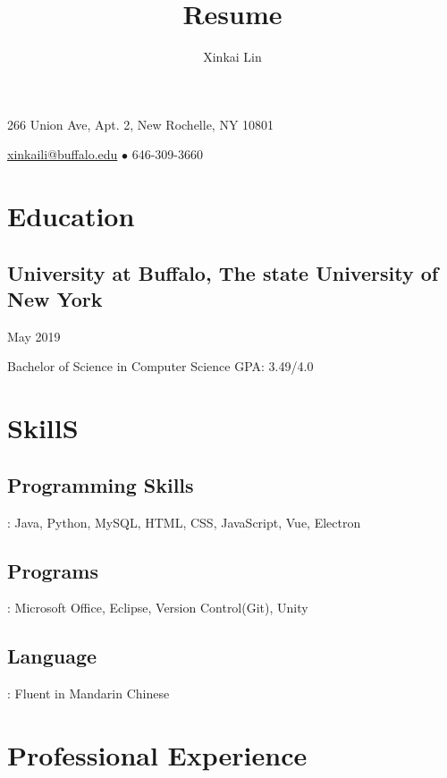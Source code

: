 \documentclass[11pt, letterpaper]{article} %
\makeatletter
\renewcommand{\maketitle}{
\begin{center}
{\Huge\bfseries
\theauthor}

266 Union Ave, Apt. 2, New Rochelle, NY 10801

\href{mailto:xinkaili@buffalo.edu}{xinkaili@buffalo.edu} $\bullet$ 646-309-3660

\end{center}
}
\makeatother
\begin{document}
\title{Resume} 
\author{Xinkai Lin}

\maketitle


\section{Education}
\subsection{University at Buffalo, The state University of New York}
\hspace*{\fill}May 2019

\noindent Bachelor of Science in Computer Science 
\hspace*{\fill}GPA: 3.49/4.0\\


\section{SkillS}
\subsection{Programming Skills}
: Java, Python, MySQL, HTML, CSS, JavaScript, Vue, Electron

\subsection{Programs}
: Microsoft Office, Eclipse, Version Control(Git), Unity

\subsection{Language}
: Fluent in Mandarin Chinese\\


\section{Professional Experience}
\end{document}
